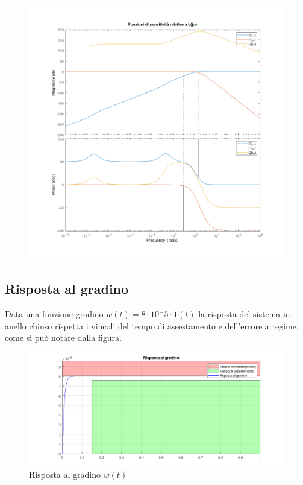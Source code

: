 \documentclass{article}
\begin{document}
\begin{figure}[!h]
\centering
\includegraphics[width=1\textwidth]{grafici/fig10.png}
\end{figure}


\newpage
\subsection{Risposta al gradino}
Data una funzione gradino $w(t)=8\cdot10{^-5}\cdot1(t)$ la risposta del sistema in anello chiuso rispetta i vincoli del tempo di assestamento e dell'errore a regime, come si può notare dalla figura.

\begin{figure}[!h]
\centering
\includegraphics[width=1\textwidth]{grafici/fig4.png}
\caption{\label{fig:orbit}Risposta al gradino $w(t)$}
\end{figure}
\end{document}
